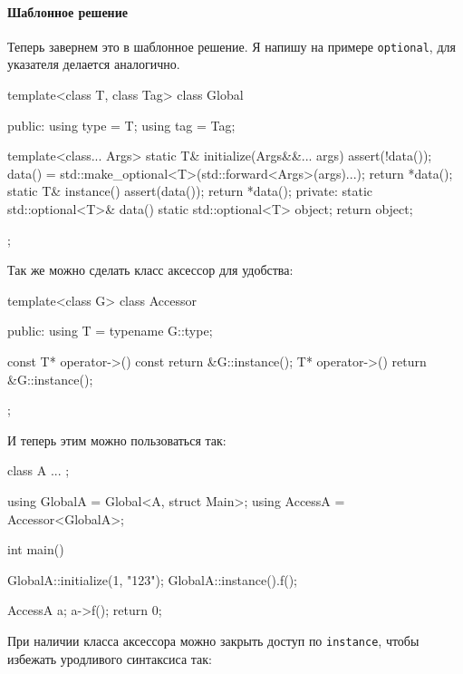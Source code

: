 \paragraph{Шаблонное решение}

Теперь завернем это в шаблонное решение.
Я напишу на примере \verb"optional", для указателя делается аналогично.
\begin{cppcode}
template<class T, class Tag>
class Global {
public:
  using type = T;
  using tag = Tag;

  template<class... Args>
  static T& initialize(Args&&... args) {
    assert(!data());
    data() = std::make_optional<T>(std::forward<Args>(args)...);
    return *data();
  }
  static T& instance() {
    assert(data());
    return *data();
  }
private:
  static std::optional<T>& data() {
    static std::optional<T> object;
    return object;
  }
};
\end{cppcode}
Так же можно сделать класс аксессор для удобства:
\begin{cppcode}
template<class G>
class Accessor {
public:
  using T = typename G::type;

  const T* operator->() const {
    return &G::instance();
  }
  T* operator->() {
    return &G::instance();
  }
};
\end{cppcode}
И теперь этим можно пользоваться так:
\begin{cppcode}
class A { ... };

using GlobalA = Global<A, struct Main>;
using AccessA = Accessor<GlobalA>;

int main() {
  GlobalA::initialize(1, "123");
  GlobalA::instance().f();
  
  AccessA a;
  a->f();
  return 0;  
}
\end{cppcode}
При наличии класса аксессора можно закрыть доступ по \verb"instance", чтобы избежать уродливого синтаксиса так:
